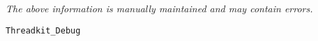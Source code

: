\label{pkg:threadkit\_debug}

{\tiny \it The above information is manually maintained and may contain errors.}
\begin{verbatim}
Threadkit_Debug
\end{verbatim}
